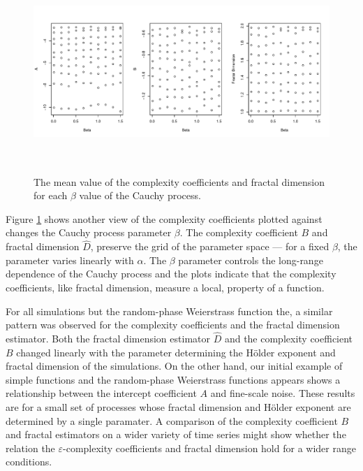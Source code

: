 \begin{figure}[h]
  \begin{center}
  \includegraphics[height = 3in, width =6in, keepaspectratio]{./figs/cauchybeta-scatterplots.pdf}
  \end{center}
  \caption{The mean value of the complexity coefficients and fractal dimension for each $\beta$ value of the Cauchy process.}
 \label{fig:cauchy-beta}
\end{figure}

Figure \ref{fig:cauchy-beta} shows another view of 
the complexity coefficients plotted against 
changes the Cauchy process parameter $\beta$. The complexity 
coefficient $B$ and fractal dimension $\hat D$, 
 preserve the grid of the parameter space --- for a fixed 
$\beta$, the parameter varies linearly with $\alpha$. The  
$\beta$ parameter controls the long-range dependence of 
the Cauchy process and the plots indicate that 
the complexity coefficients, like fractal dimension,
measure a local, property of a function.


For all simulations but the random-phase Weierstrass function 
the, a similar pattern was observed for the complexity 
coefficients and the fractal dimension estimator. Both 
the fractal dimension estimator $\hat D$ and the complexity 
coefficient $B$ changed linearly with the parameter
determining the H\"older exponent and fractal dimension of 
the simulations. 
 On the other hand, our initial example of simple functions and the random-phase Weierstrass functions appears shows a relationship between the intercept 
coefficient $A$ and fine-scale noise. These results are for a small set of processes whose fractal dimension and H\"older exponent are
determined by a single paramater. A comparison of the complexity coefficient $B$ and fractal estimators on a wider variety of time series might show whether the relation the $\varepsilon$-complexity coefficients and fractal dimension hold for a wider range 
conditions. 


